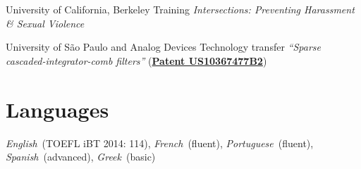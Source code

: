 \documentclass{cvlfoc}
\begin{document}
\begin{entrydate}
		{University of California, Berkeley}
		{Training}
		{\emph{Intersections: Preventing Harassment \& Sexual Violence}}

		{University of S\~{a}o Paulo {\normalfont and} Analog Devices}
		{Technology transfer}
		{\emph{``Sparse cascaded-integrator-comb filters''}
		(\href{https://patents.google.com/patent/US10367477B2}{\textbf{Patent US10367477B2}})}
\end{entrydate}



\section*{Languages}

\textit{English}~(TOEFL iBT 2014: 114),
\textit{French}~(fluent),
\textit{Portuguese}~(fluent),
\textit{Spanish}~(advanced),
\textit{Greek}~(basic)


\end{document}
